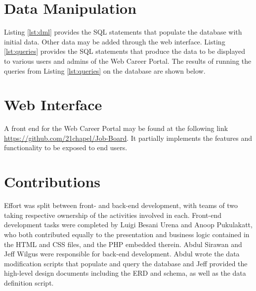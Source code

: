 \documentclass{article}
\begin{document}
    \section{Data Manipulation}
        Listing \ref{lst:dml} provides the SQL statements that populate the database with initial data. Other data may
        be added through the web interface.  Listing \ref{lst:queries} provides the SQL statements that produce the data
        to be displayed to various users and admins of the Web Career Portal.  The results of running
        the queries from Listing \ref{lst:queries} on the database are shown below. 
    \section{Web Interface}
        A front end for the Web Career Portal may be found at the following link
        \url{https://github.com/21chapel/Job-Board}. It partially implements the features and functionality to be
        exposed to end users.
    \section{Contributions}
        Effort was split between front- and back-end development, with teams of two taking respective ownership of the
        activities involved in each. Front-end development tasks were completed by Luigi Besani Urena and Anoop
        Pukulakatt, who both contributed equally to the presentation and business logic contained in the HTML and CSS
        files, and the PHP embedded therein. Abdul Sirawan and Jeff Wilgus were responsible for back-end development.
        Abdul wrote the data modification scripts that populate and query the database and Jeff provided the high-level 
        design documents including the ERD and schema, as well as the data definition script.
\end{document}
